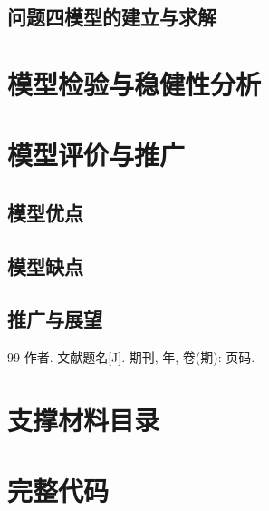 \documentclass[withoutpreface,bwprint]{cumcmthesis}
\begin{document}
\subsection{问题四模型的建立与求解}

\section{模型检验与稳健性分析}

\section{模型评价与推广}

\subsection{模型优点}

\subsection{模型缺点}

\subsection{推广与展望}

\begin{thebibliography}{99}
 作者. 文献题名[J]. 期刊, 年, 卷(期): 页码.
\end{thebibliography}

\begin{appendices}
\section{支撑材料目录}

\section{完整代码}
\end{appendices}
\end{document}
